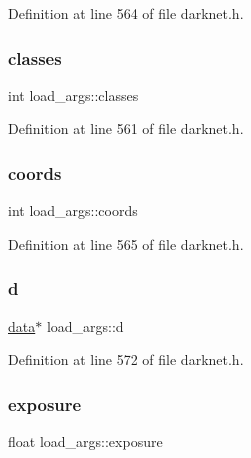 Definition at line 564 of file darknet.\+h.

\mbox{\label{structload__args_af12ce52f9bf54ea7985cb0e9b9dfaf55}} 
\subsubsection{\texorpdfstring{classes}{classes}}
{\footnotesize\ttfamily int load\+\_\+args\+::classes}



Definition at line 561 of file darknet.\+h.

\mbox{\label{structload__args_a8db147261d62a355ba735d96f99ada43}} 
\subsubsection{\texorpdfstring{coords}{coords}}
{\footnotesize\ttfamily int load\+\_\+args\+::coords}



Definition at line 565 of file darknet.\+h.

\mbox{\label{structload__args_a0b1c4f762d67a0f0cbcc1241cfa5463d}} 
\subsubsection{\texorpdfstring{d}{d}}
{\footnotesize\ttfamily \mbox{\hyperlink{structdata}{data}}$\ast$ load\+\_\+args\+::d}



Definition at line 572 of file darknet.\+h.

\mbox{\label{structload__args_a3db966b80533d8c5003372710f9e8632}} 
\subsubsection{\texorpdfstring{exposure}{exposure}}
{\footnotesize\ttfamily float load\+\_\+args\+::exposure}



